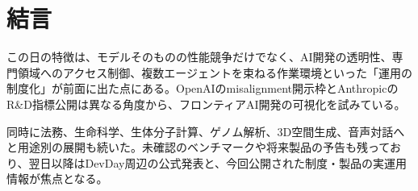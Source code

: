 \section*{結言}
この日の特徴は、モデルそのものの性能競争だけでなく、AI開発の透明性、専門領域へのアクセス制御、複数エージェントを束ねる作業環境といった「運用の制度化」が前面に出た点にある。OpenAIのmisalignment開示枠とAnthropicのR\&D指標公開は異なる角度から、フロンティアAI開発の可視化を試みている。

同時に法務、生命科学、生体分子計算、ゲノム解析、3D空間生成、音声対話へと用途別の展開も続いた。未確認のベンチマークや将来製品の予告も残っており、翌日以降はDevDay周辺の公式発表と、今回公開された制度・製品の実運用情報が焦点となる。
